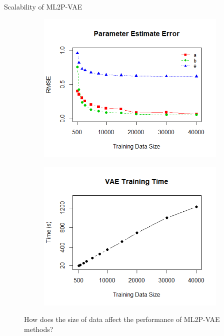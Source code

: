 \documentclass{beamer}
\theoremstyle{definition}
\begin{document}
\begin{frame}{Scalability of ML2P-VAE}
\begin{figure}[h]
\centering
    \begin{subfigure}{.47\textwidth}
      \centering
      \includegraphics[width=\linewidth]{../img/ml_journal_results/vae_full_train_size_error.png}
    \end{subfigure}
    \begin{subfigure}{.47\textwidth}
      \centering
      \includegraphics[width=\linewidth]{../img/ml_journal_results/vae_full_train_size_time.png}
    \end{subfigure}
    \caption*{\scriptsize How does the size of data affect the performance of ML2P-VAE methods?}
\end{figure}

\end{frame}
\end{document}

